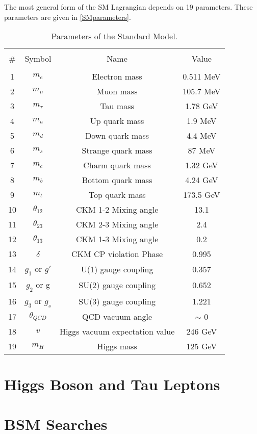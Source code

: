 The most general form of the SM Lagrangian depends on 19 parameters. These parameters are given in \autoref{SMparameters}.
\begin{table*}[h]
	{\setlength{\tabcolsep}{14pt}
		\caption{Parameters of the Standard Model.}
		\begin{center}
			\vspace{-6mm}
			\begin{tabular}{cccc}
				\hline \\[-2.45ex] \hline \\[-2.1ex]
				\# & Symbol & Name & Value \\
				\hline \\[-1.8ex]
				1 & $m_e$ & Electron mass & 0.511 MeV \\
				2 & $m_\mu$ & Muon mass & 105.7 MeV \\
				3 & $m_\tau$ & Tau mass & 1.78 GeV \\
				4 & $m_u$ & Up quark mass & 1.9 MeV \\
				5 & $m_d$ & Down quark mass & 4.4 MeV \\
				6 & $m_s$ & Strange quark mass & 87 MeV \\
				7 & $m_c$ & Charm quark mass & 1.32 GeV \\
				8 & $m_b$ & Bottom quark mass & 4.24 GeV \\
				9 & $m_t$ & Top quark mass & 173.5 GeV \\
				10 & $\theta_{12}$ & CKM 1-2 Mixing angle & 13.1\textdegree \\
				11 & $\theta_{23}$ & CKM 2-3 Mixing angle & 2.4\textdegree \\
				12 & $\theta_{13}$ & CKM 1-3 Mixing angle & 0.2\textdegree \\
				13 & $\delta$ & CKM CP violation Phase & 0.995 \\
				14 & $g_1$ or $g\prime$ & U(1) gauge coupling & 0.357 \\
				15 & $g_2$ or g & SU(2) gauge coupling & 0.652 \\
				16 & $g_3$ or $g_s$ & SU(3) gauge coupling & 1.221 \\
				17 & $\theta_{QCD}$ & QCD vacuum angle & $\sim $ 0 \\
				18 & $v$ & Higgs vacuum expectation value & 246 GeV \\
				19 & $m_H$ & Higgs mass & 125 GeV \\
				\hline
			\end{tabular}
			\vspace{-6mm}
		\end{center}
		\label{SMparameters}}
\end{table*}

\section{Higgs Boson and Tau Leptons}



\section{BSM Searches}

